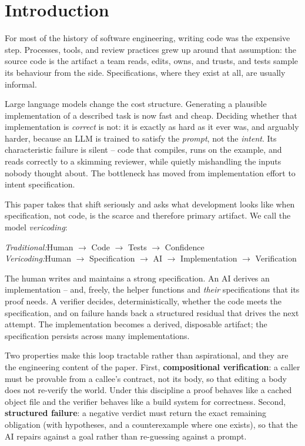 \documentclass[sigconf,nonacm]{acmart}
\begin{document}
\section{Introduction}
\label{sec:intro}

For most of the history of software engineering, writing code was the expensive
step. Processes, tools, and review practices grew up around that assumption: the
source code is the artifact a team reads, edits, owns, and trusts, and tests
sample its behaviour from the side. Specifications, where they exist at all, are
usually informal.

Large language models change the cost structure. Generating a plausible
implementation of a described task is now fast and cheap. Deciding whether that
implementation is \emph{correct} is not: it is exactly as hard as it ever was,
and arguably harder, because an LLM is trained to satisfy the \emph{prompt}, not
the \emph{intent}. Its characteristic failure is silent -- code that compiles,
runs on the example, and reads correctly to a skimming reviewer, while quietly
mishandling the inputs nobody thought about. The bottleneck has moved from
implementation effort to intent specification.

This paper takes that shift seriously and asks what development looks like when
specification, not code, is the scarce and therefore primary artifact. We call
the model \emph{vericoding}:

\begin{center}
\emph{Traditional:}\quad Human $\rightarrow$ Code $\rightarrow$ Tests $\rightarrow$ Confidence\\[2pt]
\emph{Vericoding:}\quad Human $\rightarrow$ Specification $\rightarrow$ AI $\rightarrow$ Implementation $\rightarrow$ Verification
\end{center}

The human writes and maintains a strong specification. An AI derives an
implementation -- and, freely, the helper functions and \emph{their}
specifications that its proof needs. A verifier decides, deterministically,
whether the code meets the specification, and on failure hands back a structured
residual that drives the next attempt. The implementation becomes a derived,
disposable artifact; the specification persists across many implementations.

Two properties make this loop tractable rather than aspirational, and they are
the engineering content of the paper. First, \textbf{compositional verification}:
a caller must be provable from a callee's contract, not its body, so that editing
a body does not re-verify the world. Under this discipline a proof behaves like a
cached object file and the verifier behaves like a build system for correctness.
Second, \textbf{structured failure}: a negative verdict must return the exact
remaining obligation (with hypotheses, and a counterexample where one exists), so
that the AI repairs against a goal rather than re-guessing against a prompt.
\end{document}
